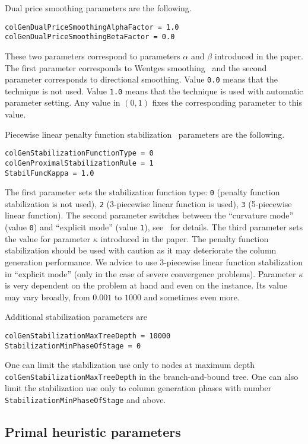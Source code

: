 \documentclass[10pt,a4paper]{article}
\begin{document}
Dual price smoothing parameters are the following.
\begin{lstlisting}
colGenDualPriceSmoothingAlphaFactor = 1.0
colGenDualPriceSmoothingBetaFactor = 0.0
\end{lstlisting}
These two parameters correspond to parameters $\alpha$ and $\beta$ introduced in the paper. The first parameter
corresponds to Wentges smoothing~\cite{Wentges:97a} and the second parameter corresponds to directional smoothing. Value
\verb+0.0+ means that the technique is not used. Value \verb+1.0+ means that the technique is used with automatic
parameter setting. Any value in $(0, 1)$ fixes the corresponding parameter to this value.

Piecewise linear penalty function stabilization~\cite{Ben-AmorDesrosierFrangioni:09a} parameters are the following.
\begin{lstlisting}
colGenStabilizationFunctionType = 0
colGenProximalStabilizationRule = 1
StabilFuncKappa = 1.0
\end{lstlisting}
The first parameter sets the stabilization function type: \verb+0+ (penalty function stabilization is not used),
\verb+2+ (3-piecewise linear function is used), \verb+3+ (5-piecewise linear function). The second parameter switches
between the ``curvature mode'' (value \verb+0+) and ``explicit mode'' (value \verb+1+),
see~\cite{PessoaSadykovUchoa:18b} for details. The third parameter sets the value for parameter $\kappa$ introduced in
the paper. The penalty function stabilization should be used with caution as it may deteriorate the column generation
performance. We advice to use 3-piecewise linear function stabilization in ``explicit mode'' (only in the case of severe
convergence problems). Parameter $\kappa$ is very dependent on the problem at hand and even on the instance. Its value
may vary broadly, from $0.001$ to $1000$ and sometimes even more.  

Additional stabilization parameters are
\begin{lstlisting}
colGenStabilizationMaxTreeDepth = 10000
StabilizationMinPhaseOfStage = 0
\end{lstlisting}
One can limit the stabilization use only to nodes at maximum depth\\ \verb+colGenStabilizationMaxTreeDepth+ in the
branch-and-bound tree. One can also limit the stabilization use only to column generation phases with number
\verb+StabilizationMinPhaseOfStage+ and above.

\subsection{Primal heuristic parameters}
\label{sec:heurconfig}
\end{document}
